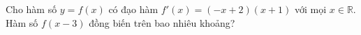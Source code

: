 \begin{ex}
Cho hàm số $y=f(x)$ có đạo hàm $f'(x)=(-x+2)(x+1)$ với mọi $x\in\mathbb R$. Hàm số $f(x-3)$ đồng biến trên bao nhiêu khoảng?
\end{ex}
